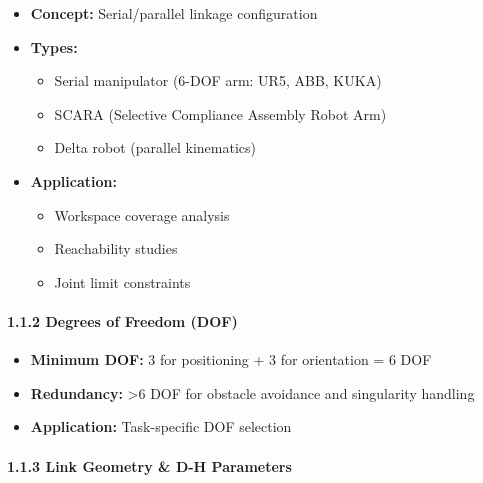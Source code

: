 \documentclass[
]{article}
\providecommand{\tightlist}{%
  \setlength{\itemsep}{0pt}\setlength{\parskip}{0pt}}
\begin{document}
\begin{itemize}
\tightlist
\item
  \textbf{Concept:} Serial/parallel linkage configuration
\item
  \textbf{Types:}

  \begin{itemize}
  \tightlist
  \item
    Serial manipulator (6-DOF arm: UR5, ABB, KUKA)
  \item
    SCARA (Selective Compliance Assembly Robot Arm)
  \item
    Delta robot (parallel kinematics)
  \end{itemize}
\item
  \textbf{Application:}

  \begin{itemize}
  \tightlist
  \item
    Workspace coverage analysis
  \item
    Reachability studies
  \item
    Joint limit constraints
  \end{itemize}
\end{itemize}

\hypertarget{degrees-of-freedom-dof}{%
\paragraph{1.1.2 Degrees of Freedom
(DOF)}\label{degrees-of-freedom-dof}}

\begin{itemize}
\tightlist
\item
  \textbf{Minimum DOF:} 3 for positioning + 3 for orientation = 6 DOF
\item
  \textbf{Redundancy:} \textgreater6 DOF for obstacle avoidance and
  singularity handling
\item
  \textbf{Application:} Task-specific DOF selection
\end{itemize}

\hypertarget{link-geometry-d-h-parameters}{%
\paragraph{1.1.3 Link Geometry \& D-H
Parameters}\label{link-geometry-d-h-parameters}}
\end{document}
